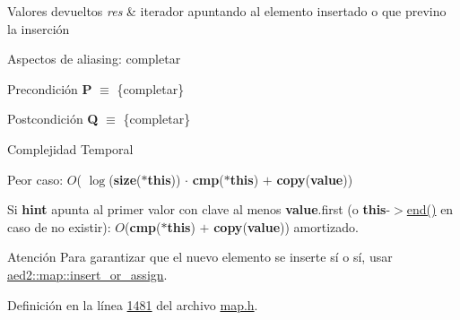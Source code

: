 \begin{DoxyRetVals}{Valores devueltos}
{\em res} & iterador apuntando al elemento insertado o que previno la inserción\\
\hline
\end{DoxyRetVals}
\begin{DoxyParagraph}{Aspectos de aliasing\+:}
completar
\end{DoxyParagraph}
\begin{DoxyPrecond}{Precondición}
{\bfseries P} $\equiv$ \{completar\} 
\end{DoxyPrecond}
\begin{DoxyPostcond}{Postcondición}
{\bfseries Q} $\equiv$ \{completar\}
\end{DoxyPostcond}

\begin{DoxyDescription}
\item[Complejidad Temporal]
\begin{DoxyItemize}
\item Peor caso\+: $O$( $\log$({\bfseries size}({\bfseries $\ast$this})) $\cdot$ {\bfseries cmp}({\bfseries $\ast$this}) $+$ {\bfseries copy}({\bfseries value}))
\item Si {\bfseries hint} apunta al primer valor con clave al menos {\bfseries value}.first (o {\bfseries this}-\/$>$\hyperlink{classaed2_1_1map_a76023e6a56cb625513e1b5ea028bf983_a76023e6a56cb625513e1b5ea028bf983}{end()} en caso de no existir)\+: $O$({\bfseries cmp}({\bfseries $\ast$this}) $+$ {\bfseries copy}({\bfseries value})) amortizado. 
\end{DoxyItemize}
\end{DoxyDescription}

\begin{DoxyAttention}{Atención}
Para garantizar que el nuevo elemento se inserte sí o sí, usar \hyperlink{classaed2_1_1map_a2ef6723c183916276b0afc4a4c721475_a2ef6723c183916276b0afc4a4c721475}{aed2\+::map\+::insert\+\_\+or\+\_\+assign}. 
\end{DoxyAttention}


Definición en la línea \hyperlink{map_8h_source_l01481}{1481} del archivo \hyperlink{map_8h_source}{map.\+h}.

\mbox{\label{classaed2_1_1map_ad764851f1534f2db0964c4f729056a1e_ad764851f1534f2db0964c4f729056a1e}} 
